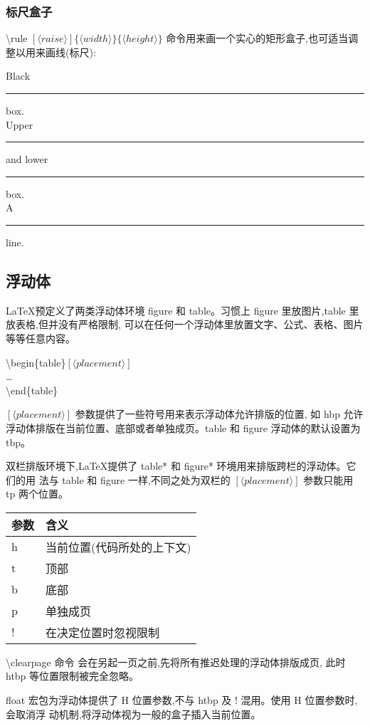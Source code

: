 \documentclass[a4paper]{ctexart}
\begin{document}
    \subsubsection{标尺盒子}
    \textbackslash rule $[\langle raise\rangle]\{\langle width\rangle\}\{\langle height\rangle\}$%
    命令用来画一个实心的矩形盒子,也可适当调整以用来画线(标尺):\par
    Black \rule{12pt}{4pt} box.\\
    Upper \rule[4pt]{6pt}{8pt} and lower \rule[-4pt]{6pt}{8pt} box.\\
    A \rule[-.4pt]{6pt}{.4pt} line.\par
    \subsection{浮动体}
    \LaTeX 预定义了两类浮动体环境 figure 和 table。习惯上 figure 里放图片,table 里放表格,但并没有严格限制,%
    可以在任何一个浮动体里放置文字、公式、表格、图片等等任意内容。\par
    \textbackslash begin\{table\}$[\langle placement\rangle]$\\
    \ldots\\
    \textbackslash end\{table\}\par
    $[\langle placement\rangle]$ 参数提供了一些符号用来表示浮动体允许排版的位置,%
    如 hbp 允许浮动体排版在当前位置、底部或者单独成页。table 和 figure 浮动体的默认设置为 tbp。\par
    双栏排版环境下,\LaTeX 提供了 table* 和 figure* 环境用来排版跨栏的浮动体。它们的用%
    法与 table 和 figure 一样,不同之处为双栏的 $[\langle placement\rangle]$ 参数只能用 tp 两个位置。\par
    \begin{tabular}{ll}
        \toprule
        参数     & 含义\\
        \midrule
        h       & 当前位置(代码所处的上下文)\\
        t       & 顶部\\
        b       & 底部\\ 
        p       & 单独成页\\ 
        !       & 在决定位置时忽视限制\\
        \bottomrule
    \end{tabular}\par
    \textbackslash clearpage 命令 会在另起一页之前,先将所有推迟处理的浮动体排版成页,%
    此时 htbp 等位置限制被完全忽略。\par
    float 宏包为浮动体提供了 H 位置参数,不与 htbp 及 ! 混用。使用 H 位置参数时,%
    会取消浮 动机制,将浮动体视为一般的盒子插入当前位置。\par
\end{document}
